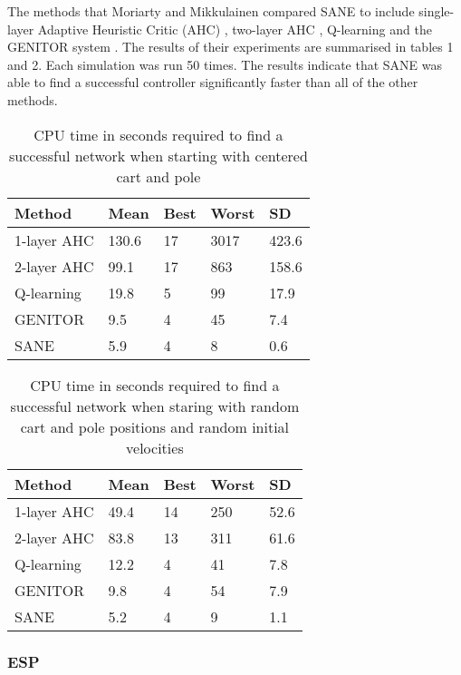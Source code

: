 \documentclass[12pt]{article} %
\begin{document}
The methods that Moriarty and Mikkulainen compared SANE to include single-layer Adaptive Heuristic Critic (AHC) \cite{Barto1983}, two-layer AHC \cite{Anderson1987}, Q-learning \cite{Watkins1992} and the GENITOR system \cite{Whitley1994}. The results of their experiments are summarised in tables 1 and 2. Each simulation was run 50 times. The results indicate that SANE was able to find a successful controller significantly faster than all of the other methods.

\begin{table}
    \begin{tabular}{|l|l|l|l|l|}
    \hline
    Method      & Mean  & Best & Worst & SD    \\ \hline
    1-layer AHC & 130.6 & 17   & 3017  & 423.6 \\ \hline
    2-layer AHC & 99.1  & 17   & 863   & 158.6 \\ \hline
    Q-learning  & 19.8  & 5    & 99    & 17.9  \\ \hline
    GENITOR     & 9.5   & 4    & 45    & 7.4   \\ \hline
    SANE        & 5.9   & 4    & 8     & 0.6   \\ \hline
    \end{tabular}
    \caption {CPU time in seconds required to find a successful network when starting with centered cart and pole}
\end{table}

\begin{table}
    \begin{tabular}{|l|l|l|l|l|}
    \hline
    Method      & Mean & Best & Worst & SD   \\ \hline
    1-layer AHC & 49.4 & 14   & 250   & 52.6 \\ \hline
    2-layer AHC & 83.8 & 13   & 311   & 61.6 \\ \hline
    Q-learning  & 12.2 & 4    & 41    & 7.8  \\ \hline
    GENITOR     & 9.8  & 4    & 54    & 7.9  \\ \hline
    SANE        & 5.2  & 4    & 9     & 1.1  \\ \hline
    \end{tabular}
    \caption {CPU time in seconds required to find a successful network when staring with random cart and pole positions and random initial velocities}
\end{table}

\subsubsection{ESP}
\end{document}
